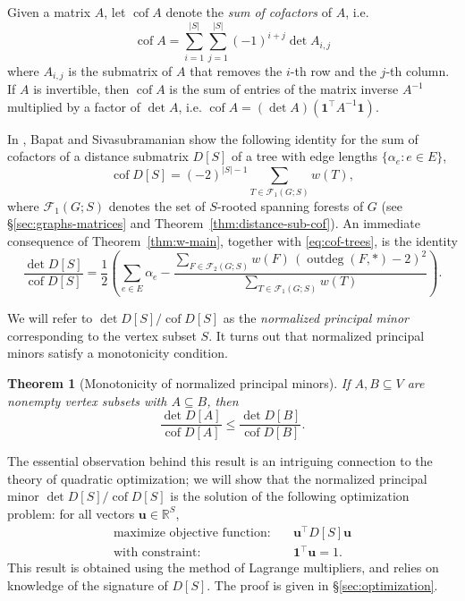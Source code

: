 \documentclass[12pt]{amsart}
\newtheorem{thm}{Theorem}[section]
\theoremstyle{definition}
\newcommand{\RR}{\mathbb{R}}
\newcommand{\bone}{\mathbf{1}}
\newcommand{\boldu}{\mathbf{u}}
\newcommand{\tr}{\intercal}
\DeclareMathOperator{\cof}{cof}
\newcommand{\trees}{\mathcal{F}_1}
\newcommand{\forests}{\mathcal{F}}
\DeclareMathOperator{\outdeg}{outdeg}
\begin{document}
Given a matrix $A$, let $\cof A$ denote the {\em sum of cofactors} of $A$, i.e. 
\begin{equation}\label{eq:cof}
	\cof A = \sum_{i = 1}^{|S|} \sum_{j = 1}^{|S|} (-1)^{i + j} \det A_{i,j} 
\end{equation}
where $A_{i,j}$ is the submatrix of $A$ that removes the $i$-th row and the $j$-th column.
If $A$ is invertible, then $\cof A$ is the sum of entries of the matrix inverse $A^{-1}$ multiplied by a factor of $\det A$, i.e. $\cof A = (\det A) (\bone^\tr A^{-1} \bone)$.

In \cite{bapat-sivasubramanian}, Bapat and Sivasubramanian show the following identity for the sum of cofactors of a distance submatrix $D[S]$ of a tree with edge lengths $\{\alpha_e \colon e \in E\}$,
\begin{equation}\label{eq:cof-trees}
	\cof D[S] = (-2)^{|S| - 1} \!\!\!\sum_{T \in \trees(G;S)} w(T) , 
\end{equation}
where $\trees(G;S)$ denotes the set of $S$-rooted spanning forests of $G$ (see \S\ref{sec:graphs-matrices} and Theorem~\ref{thm:distance-sub-cof}).
An immediate consequence of Theorem~\ref{thm:w-main}, together with \eqref{eq:cof-trees}, is the identity
\begin{equation}
\label{eq:det-cof}
	\frac{\det D[S]}{\cof D[S]} = \frac12 \left( \sum_{e \in E} \alpha_e - \frac{\sum_{F \in \forests_2(G; S)} w(F) \,(\outdeg(F,*) - 2)^2}{\sum_{T \in \trees(G; S)} w(T)} \right).
\end{equation}

We will refer to ${\det D[S]}/{\cof D[S]}$ as the {\em normalized principal minor} corresponding to the vertex subset $S$. 
It turns out that normalized principal minors satisfy a monotonicity condition.

\begin{thm}[Monotonicity of normalized principal minors]
\label{thm:monotonic}
If $A,B \subseteq V$ are nonempty vertex subsets with $A \subseteq B$,
then
\begin{equation*}
	\frac{\det D[A]}{\cof D[A]}  \leq \frac{\det D[B]}{\cof D[B]}.
\end{equation*}
\end{thm}

The essential observation behind this result is an intriguing connection to the theory of quadratic optimization; 
we will show that the normalized principal minor $\det D[S] / \cof D[S]$ is the solution of the following optimization problem: for all vectors $ \boldu \in \RR^S$,
\begin{align}
	\text{maximize objective function:} &\quad \boldu^\tr D[S] \boldu \\
	\text{with constraint:} &\quad \bone^\tr \boldu = 1.
\end{align}
This result is obtained using the method of Lagrange multipliers,
and relies on knowledge of the signature of $D[S]$.
The proof is given in \S\ref{sec:optimization}.
\end{document}
